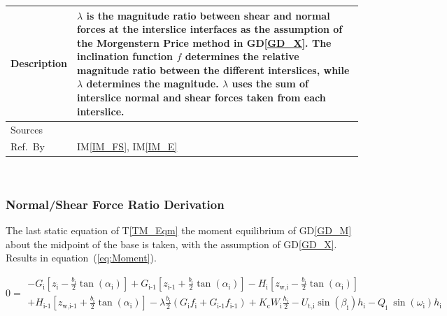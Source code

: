 \documentclass[12pt]{article}
\newcommand{\tref}[1]{T\ref{#1}}
\newcommand{\iref}[1]{IM\ref{#1}}
\newcommand{\dref}[1]{GD\ref{#1}}
\begin{document}
\begin{minipage}{\textwidth}
\begin{tabular}{| p{1.5cm} | p{14cm} |}
\hline Description & $\lambda$ is the magnitude ratio between shear
and normal forces at the interslice interfaces as the assumption of
the Morgenstern Price method in \dref{GD_X}. The inclination function
$f$ determines the relative magnitude ratio between the different
interslices, while $\lambda$ determines the magnitude. $\lambda$ uses
the sum of interslice normal and shear forces taken from each
interslice. \\

\hline Sources& \cite{ZhuEtAl2005}\\

\hline Ref.\ By & \iref{IM_FS}, \iref{IM_E} \\

\hline
\end{tabular}
\end{minipage}\\


\subsubsection*{Normal/Shear Force Ratio Derivation}

 The last static equation of \tref{TM_Eqm} the moment equilibrium of
 \dref{GD_M} about the midpoint of the base is taken, with the
 assumption of \dref{GD_X}. Results in equation~(\ref{eq:Moment}).

\begin{equation}\label{eq:Moment}
  0 = \begin{array}{l} - {G}_{\text{i}} \left[ {z_{\text{i}}} -
      \frac{b_{\text{i}}}{2} { \tan\left(\alpha_{\text{i}}\right)}
      \right] + {G}_{\text{i-1}} \left[ {z_{\text{i-1}}} +
      \frac{b_{\text{i}}}{2} { \tan\left(\alpha_{\text{i}}\right)}
      \right] - H_{\text{i}}\left[ z_{\text{w,i}} -
      \frac{b_{\text{i}}}{2} { \tan\left(\alpha_{\text{i}}\right)}
      \right] \\[5pt] + H_{\text{i-1}}\left[ z_{\text{w,i-1}} +
      \frac{b_{\text{i}}}{2} { \tan\left(\alpha_{\text{i}}\right)}
      \right] -\lambda \frac{b_{\text{i}}}{2} \left( G_{\text{i}}
    f_{\text{i}} + G_{\text{i-1}} f_{\text{i-1}} \right) +
    K_{\text{c}} W_{\text{i}} \frac{h_{\text{i}}}{2} - U_{\text{t,i}}
    \sin\left(\beta_{\text{i}}\right) h_{\text{i}} -
    Q_{\text{i}}\;{\sin\left(\omega_{\text{i}}\right)}
    h_{\text{i}} \end{array}
\end{equation} 
\end{document}
